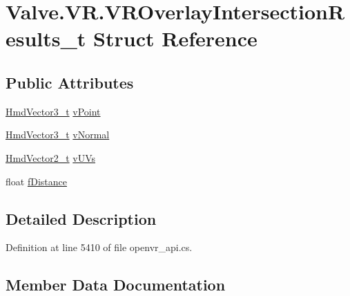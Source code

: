 \hypertarget{struct_valve_1_1_v_r_1_1_v_r_overlay_intersection_results__t}{}\section{Valve.\+V\+R.\+V\+R\+Overlay\+Intersection\+Results\+\_\+t Struct Reference}
\label{struct_valve_1_1_v_r_1_1_v_r_overlay_intersection_results__t}
\subsection*{Public Attributes}
\begin{DoxyCompactItemize}
\item 
\mbox{\hyperlink{struct_valve_1_1_v_r_1_1_hmd_vector3__t}{Hmd\+Vector3\+\_\+t}} \mbox{\hyperlink{struct_valve_1_1_v_r_1_1_v_r_overlay_intersection_results__t_a79153412d2a7650c3cbd0353fb742ce1}{v\+Point}}
\item 
\mbox{\hyperlink{struct_valve_1_1_v_r_1_1_hmd_vector3__t}{Hmd\+Vector3\+\_\+t}} \mbox{\hyperlink{struct_valve_1_1_v_r_1_1_v_r_overlay_intersection_results__t_a4d75ecf579f579f4f321bfefc7d97832}{v\+Normal}}
\item 
\mbox{\hyperlink{struct_valve_1_1_v_r_1_1_hmd_vector2__t}{Hmd\+Vector2\+\_\+t}} \mbox{\hyperlink{struct_valve_1_1_v_r_1_1_v_r_overlay_intersection_results__t_ac291743017c44b7bf2776760b3cfd497}{v\+U\+Vs}}
\item 
float \mbox{\hyperlink{struct_valve_1_1_v_r_1_1_v_r_overlay_intersection_results__t_a3af7d873b62860c3f4321cb7f0bf1481}{f\+Distance}}
\end{DoxyCompactItemize}


\subsection{Detailed Description}


Definition at line 5410 of file openvr\+\_\+api.\+cs.



\subsection{Member Data Documentation}
\mbox{\label{struct_valve_1_1_v_r_1_1_v_r_overlay_intersection_results__t_a3af7d873b62860c3f4321cb7f0bf1481}} 
